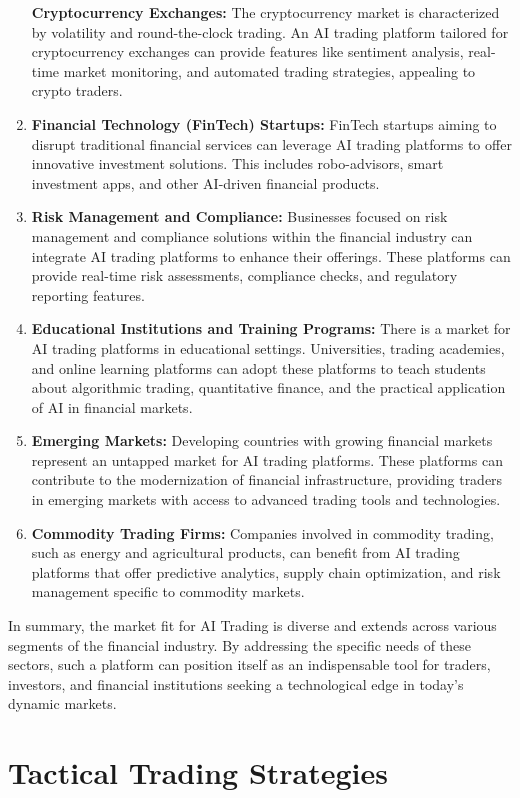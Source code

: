 \documentclass[
  letterpaper,
  DIV=11,
  numbers=noendperiod]{scrreprt}
\begin{document}
\begin{enumerate}
  \textbf{Cryptocurrency Exchanges:} The cryptocurrency market is
  characterized by volatility and round-the-clock trading. An AI trading
  platform tailored for cryptocurrency exchanges can provide features
  like sentiment analysis, real-time market monitoring, and automated
  trading strategies, appealing to crypto traders.
\item
  \textbf{Financial Technology (FinTech) Startups:} FinTech startups
  aiming to disrupt traditional financial services can leverage AI
  trading platforms to offer innovative investment solutions. This
  includes robo-advisors, smart investment apps, and other AI-driven
  financial products.
\item
  \textbf{Risk Management and Compliance:} Businesses focused on risk
  management and compliance solutions within the financial industry can
  integrate AI trading platforms to enhance their offerings. These
  platforms can provide real-time risk assessments, compliance checks,
  and regulatory reporting features.
\item
  \textbf{Educational Institutions and Training Programs:} There is a
  market for AI trading platforms in educational settings. Universities,
  trading academies, and online learning platforms can adopt these
  platforms to teach students about algorithmic trading, quantitative
  finance, and the practical application of AI in financial markets.
\item
  \textbf{Emerging Markets:} Developing countries with growing financial
  markets represent an untapped market for AI trading platforms. These
  platforms can contribute to the modernization of financial
  infrastructure, providing traders in emerging markets with access to
  advanced trading tools and technologies.
\item
  \textbf{Commodity Trading Firms:} Companies involved in commodity
  trading, such as energy and agricultural products, can benefit from AI
  trading platforms that offer predictive analytics, supply chain
  optimization, and risk management specific to commodity markets.
\end{enumerate}

In summary, the market fit for AI Trading is diverse and extends across
various segments of the financial industry. By addressing the specific
needs of these sectors, such a platform can position itself as an
indispensable tool for traders, investors, and financial institutions
seeking a technological edge in today's dynamic markets.

\chapter*{Tactical Trading
Strategies}\label{tactical-trading-strategies}
\end{document}
